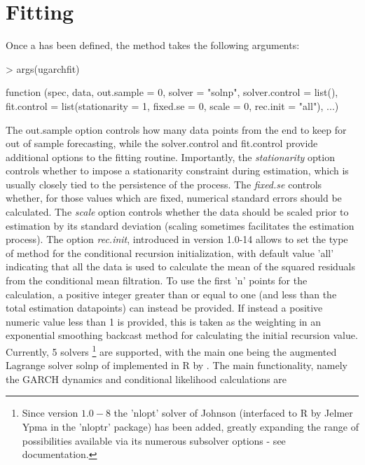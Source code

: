 \section{Fitting}\label{section:fitting}
Once a \verb@uGARCHspec@ has been defined, the \verb@ugarchfit@ method takes
the following arguments:
\begin{Schunk}
\begin{Sinput}
> args(ugarchfit)
\end{Sinput}
\begin{Soutput}
function (spec, data, out.sample = 0, solver = "solnp", solver.control = list(),
    fit.control = list(stationarity = 1, fixed.se = 0, scale = 0,
        rec.init = "all"), ...)
\end{Soutput}
\end{Schunk}
The out.sample option controls how many data points from the end to keep for out
of sample forecasting, while the solver.control and fit.control provide additional
options to the fitting routine. Importantly, the \emph{stationarity} option controls
whether to impose a stationarity constraint during estimation, which is usually
closely tied to the persistence of the process. The \emph{fixed.se} controls
whether, for those values which are fixed, numerical standard errors should be
calculated. The \emph{scale} option controls whether the data should be scaled prior
to estimation by its standard deviation (scaling sometimes facilitates the estimation
process). The option \emph{rec.init}, introduced in version 1.0-14 allows to set
the type of method for the conditional recursion initialization, with default
value 'all' indicating that all the data is used to calculate the mean of the
squared residuals from the conditional mean filtration. To use the first 'n' points
for the calculation, a positive integer greater than or equal to one (and less than
the total estimation datapoints) can instead be provided. If instead a positive
numeric value less than 1 is provided, this is taken as the weighting in an
exponential smoothing backcast method for calculating the initial recursion value.\\
Currently, 5 solvers \footnote{Since version $1.0-8$ the
'nlopt' solver of Johnson (interfaced to R by Jelmer Ypma in the 'nloptr' package)
has  been added, greatly expanding the range of possibilities available via its
numerous subsolver options - see documentation.} are supported, with the main
one being the augmented Lagrange solver solnp of \cite{Ye1997} implemented in R by
\cite{Ghalanos2011}.
The main functionality, namely the GARCH dynamics and conditional likelihood calculations are
